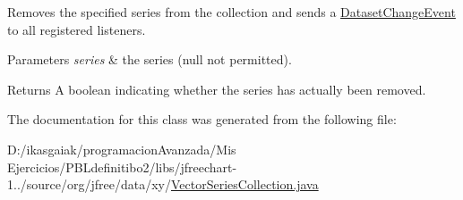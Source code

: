 Removes the specified series from the collection and sends a \mbox{\hyperlink{}{Dataset\+Change\+Event}} to all registered listeners.


\begin{DoxyParams}{Parameters}
{\em series} & the series ({\ttfamily null} not permitted).\\
\hline
\end{DoxyParams}
\begin{DoxyReturn}{Returns}
A boolean indicating whether the series has actually been removed. 
\end{DoxyReturn}


The documentation for this class was generated from the following file\+:\begin{DoxyCompactItemize}
\item 
D\+:/ikasgaiak/programacion\+Avanzada/\+Mis Ejercicios/\+P\+B\+Ldefinitibo2/libs/jfreechart-\/1../source/org/jfree/data/xy/\mbox{\hyperlink{_vector_series_collection_8java}{Vector\+Series\+Collection.\+java}}\end{DoxyCompactItemize}
